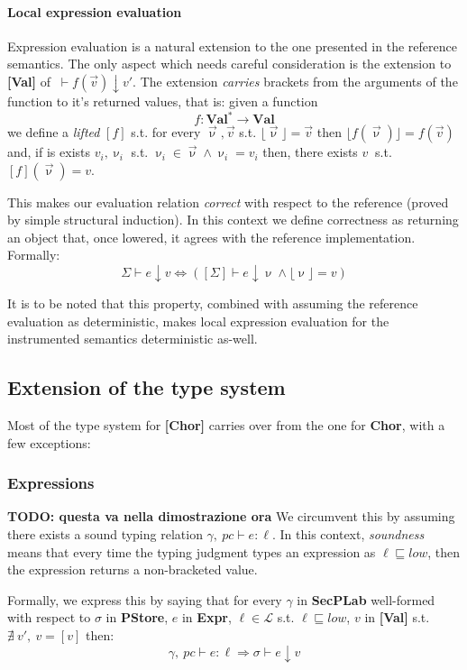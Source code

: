 \documentclass[12pt,a4paper,twoside]{book}
\newcommand{\MCL}{\mathscr{L}}
\begin{document}
\paragraph{Local expression evaluation}
Expression evaluation is a natural extension to the one presented in the reference semantics. The only aspect which needs careful consideration is the extension to \textbf{[Val]} of $~\vdash f(\vec{v}) \downarrow v'$.
The extension \emph{carries} brackets from the arguments of the function to it's returned values, that is: given a function
$$
f: \textbf{Val}^{*} \rightarrow \textbf{Val}
$$
we define a \emph{lifted} $[f]$ s.t. for every $\vec{\upnu}, \vec{v}$ s.t.
$\lfloor \vec{\upnu} \rfloor = \vec{v}$ then
$\lfloor f(\vec{\upnu}) \rfloor = f(\vec{v}) $
and, if is exists $v_i, \upnu_i$ s.t. $\upnu_i \in \vec{\upnu} \land \upnu_i = v_i$ then, there exists $v~$ s.t. $ [f](\vec{\upnu}) = v $.


This makes our evaluation relation \emph{correct} with respect to the reference (proved by simple structural induction). In this context we define correctness as returning an object that, once lowered, it agrees with the reference implementation.\\
Formally:
$$
\Sigma \vdash e \downarrow v \Leftrightarrow ( [\Sigma] \vdash e \downarrow \upnu \land \lfloor \upnu \rfloor = v )
$$

It is to be noted that this property, combined with assuming the reference evaluation as deterministic, makes local expression evaluation for the instrumented semantics deterministic as-well.

\subsection{Extension of the type system}
Most of the type system for \textbf{[Chor]} carries over from the one for \textbf{Chor}, with a few exceptions:

\subsubsection{Expressions}
\textbf{TODO: questa va nella dimostrazione ora}
We circumvent this by assuming there exists a sound typing relation $ \gamma,~pc \vdash e: \ell $.
In this context, \emph{soundness} means that every time the typing judgment types an expression as $\ell \sqsubseteq low$, then the expression returns a non-bracketed value.

Formally, we express this by saying that for every $\gamma$ in \textbf{SecPLab} well-formed with respect to $\sigma$ in \textbf{PStore}, $e$ in \textbf{Expr}, $\ell \in \MCL$ s.t. $\ell \sqsubseteq low$, $v$ in \textbf{[Val]} s.t. $\nexists~v',~v = [v]$ then:
$$
\gamma,~pc \vdash e: \ell \Rightarrow \sigma \vdash e \downarrow v
$$
\end{document}
